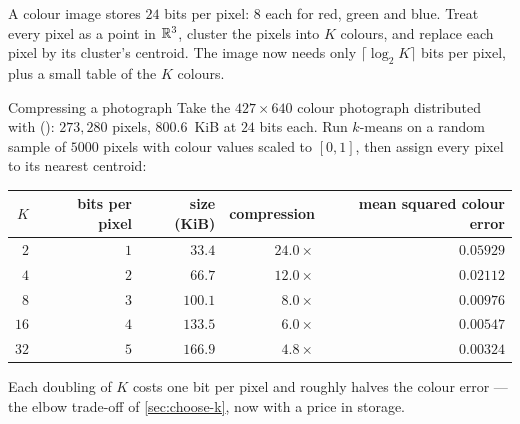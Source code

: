 A colour image stores $24$ bits per pixel: $8$ each for red, green and blue.
Treat every pixel as a point in $\mathbb{R}^{3}$, cluster the pixels into $K$ colours,
and replace each pixel by its cluster's centroid. The image now needs only
$\lceil\log_2 K\rceil$ bits per pixel, plus a small table of the $K$ colours.

\begin{workedexample}{Compressing a photograph}
Take the $427\times640$ colour photograph distributed with 
(): $273{,}280$ pixels, $800.6$~KiB at $24$
bits each. Run $k$-means on a random sample of $5000$ pixels with colour values
scaled to $[0,1]$, then assign every pixel to its nearest centroid:

\begin{center}
\small
\renewcommand{\arraystretch}{1.12}
\begin{tabular}{@{}rrrrr@{}}
\toprule
$K$ & bits per pixel & size (KiB) & compression & mean squared colour error\\
\midrule
$2$  & $1$ & $33.4$  & $24.0\times$ & $0.05929$\\
$4$  & $2$ & $66.7$  & $12.0\times$ & $0.02112$\\
$8$  & $3$ & $100.1$ & $8.0\times$  & $0.00976$\\
$16$ & $4$ & $133.5$ & $6.0\times$  & $0.00547$\\
$32$ & $5$ & $166.9$ & $4.8\times$  & $0.00324$\\
\bottomrule
\end{tabular}
\end{center}

Each doubling of $K$ costs one bit per pixel and roughly halves the colour error
--- the elbow trade-off of \cref{sec:choose-k}, now with a price in storage.
\end{workedexample}

